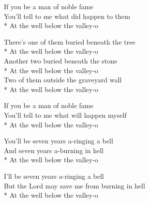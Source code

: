 \versemark
If you be a man of noble fame\\
You’ll tell to me what did happen to them\\*
\vin At the well below the valley-o

\versemark
There’s one of them buried beneath the tree\\*
\vin At the well below the valley-o\\
Another two buried beneath the stone\\*
\vin At the well below the valley-o\\
Two of them outside the graveyard wall\\*
\vin At the well below the valley-o

\versemark
If you be a man of noble fame\\
You’ll tell to me what will happen myself\\*
\vin At the well below the valley-o

\versemark
You’ll be seven years a-ringing a bell\\
And seven years a-burning in hell\\*
\vin At the well below the valley-o

\versemark
I’ll be seven years a-ringing a bell\\
But the Lord may save me from burning in hell\\*
\vin At the well below the valley-o\doublerefrain

